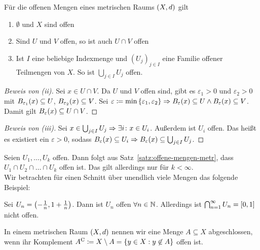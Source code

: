 \begin{satz} %
    \label{satz:offene-mengen-metr}
    Für die offenen Mengen eines metrischen Raums $\left(X, d\right)$ gilt
    \begin{enumerate}[label=(\roman*)]
        \item $\emptyset$ und $X$ sind offen
        \item Sind $U$ und $V$ offen, so ist auch $U\cap V$ offen
        \item Ist $I$ eine beliebige Indexmenge und $(U_j)_{j\in I}$ eine Familie offener Teilmengen von $X$. So ist $\bigcup_{j\in I} U_j$ offen.
    \end{enumerate}

    \begin{proof}[Beweis von (ii)]
        Sei $x\in U\cap V$. Da $U$ und $V$ offen sind, gibt es $\varepsilon_1 > 0$ und $\varepsilon_2 > 0$ mit $B_{\varepsilon_1}\of{x}\subseteq U$, $B_{\varepsilon_2}\of{x}\subseteq V$. Sei $\varepsilon\coloneqq \min\set{\varepsilon_1, \varepsilon_2} \impl B_{\varepsilon}\of{x}\subseteq U\land B_{\varepsilon}\of{x}\subseteq V$. Damit gilt $B_{\varepsilon}\of{x}\subseteq U\cap V$.
    \end{proof}

    \begin{proof}[Beweis von (iii)]
        Sei $x\in \bigcup_{j\in I} U_j \Rightarrow{} \exists i\colon x\in U_{i}$. Außerdem ist $U_{i}$ offen. Das heißt es existiert ein $\varepsilon > 0$, sodass $B_{\varepsilon}\of{x}\subseteq U_{i} \impl B_{\varepsilon}\of{x}\subseteq \bigcup_{j\in I} U_{j}$.
    \end{proof}
\end{satz}

\begin{bemerkung}
    Seien $U_1, \ldots, U_k$ offen. Dann folgt aus Satz~\ref{satz:offene-mengen-metr}, dass $U_1\cap U_2\cap\dots\cap U_k$ offen ist. Das gilt allerdings nur für $k < \infty$.\\
    Wir betrachten für einen Schnitt über unendlich viele Mengen das folgende Beispiel:
\end{bemerkung}

\begin{beispiel}
    Sei $U_n = \left(-\frac{1}{n}, 1+\frac{1}{n}\right)$. Dann ist $U_n$ offen $\forall n\in\mathbb{N}$. Allerdings ist $\bigcap_{n=1}^{\infty} U_n = \left[0, 1\right]$ nicht offen.
\end{beispiel}

\begin{definition}
    In einem metrischen Raum $\left(X, d\right)$ nennen wir eine Menge $A\subseteq X$ abgeschlossen, wenn ihr Komplement ${A}^{\mathrm{C}}\coloneqq X \setminus A = \left\{y\in X: y\not\in A\right\}$ offen ist.
\end{definition}

